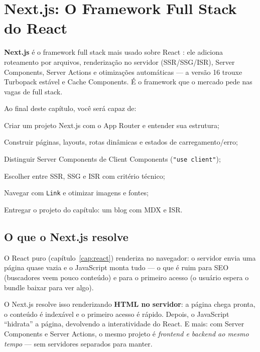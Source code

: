 \chapter{Next.js: O Framework Full Stack do React}
\label{cap:nextjs}

\begin{caixaconceito}
\textbf{Next.js} é o framework full stack mais usado sobre React
\cite{nextjs-docs}: ele adiciona roteamento por arquivos, renderização no
servidor (SSR/SSG/ISR), Server Components, Server Actions e otimizações
automáticas — a versão 16 \cite{nextjs16} trouxe Turbopack estável e Cache
Components. É o framework que o mercado pede nas vagas de full stack.
\end{caixaconceito}

Ao final deste capítulo, você será capaz de:
\begin{objetivos}
  \item Criar um projeto Next.js com o App Router e entender sua estrutura;
  \item Construir páginas, layouts, rotas dinâmicas e estados de carregamento/erro;
  \item Distinguir Server Components de Client Components (\texttt{"use client"});
  \item Escolher entre SSR, SSG e ISR com critério técnico;
  \item Navegar com \texttt{Link} e otimizar imagens e fontes;
  \item Entregar o projeto do capítulo: um blog com MDX e ISR.
\end{objetivos}

\section{O que o Next.js resolve}

O React puro (capítulo~\ref{cap:react}) renderiza no navegador: o servidor
envia uma página quase vazia e o JavaScript monta tudo — o que é ruim para
SEO (buscadores veem pouco conteúdo) e para o primeiro acesso (o usuário
espera o bundle baixar para ver algo).

O Next.js resolve isso renderizando \textbf{HTML no servidor}: a página chega
pronta, o conteúdo é indexável e o primeiro acesso é rápido. Depois, o
JavaScript ``hidrata'' a página, devolvendo a interatividade do React. E mais:
com Server Components e Server Actions, o mesmo projeto é \emph{frontend e
backend ao mesmo tempo} — sem servidores separados para manter.


